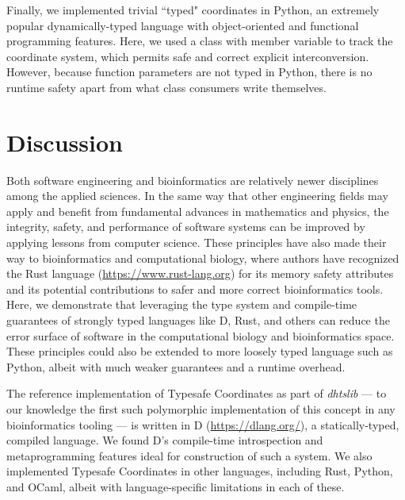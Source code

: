 \documentclass[12pt]{article}
\begin{document}
Finally, we implemented trivial ``typed" coordinates in Python, an extremely popular dynamically-typed language with object-oriented and functional programming features. Here, we used a class with member variable to track the coordinate system, which permits safe and correct explicit interconversion. However, because function parameters are not typed in Python, there is no runtime safety apart from what class consumers write themselves.

\section*{Discussion}   %

Both software engineering and bioinformatics are relatively newer disciplines among the applied sciences. In the same way that other engineering fields may apply and benefit from fundamental advances in mathematics and physics, the integrity, safety, and performance of software systems can be improved by applying lessons from computer science. These principles have also made their way to bioinformatics and computational biology, where authors have recognized the Rust language (\url{https://www.rust-lang.org}) for its memory safety attributes and its potential contributions to safer and more correct bioinformatics tools.\cite{koster_rust-bio_2016,perkel_why_2020}  Here, we demonstrate that leveraging the type system and compile-time guarantees of strongly typed languages like D, Rust, and others can reduce the error surface of software in the computational biology and bioinformatics space. These principles could also be extended to more loosely typed language such as Python, albeit with much weaker guarantees and a runtime overhead.

The reference implementation of Typesafe Coordinates as part of \textit{dhtslib}\cite{gregory_dhtslib_nodate} --- to our knowledge the first such polymorphic implementation of this concept in any bioinformatics tooling --- is written in D (\url{https://dlang.org/}), a statically-typed, compiled language. We found D's compile-time introspection and metaprogramming features ideal for construction of such a system. We also implemented Typesafe Coordinates in other languages, including Rust, Python, and OCaml, albeit with language-specific limitations in each of these.
\end{document}
